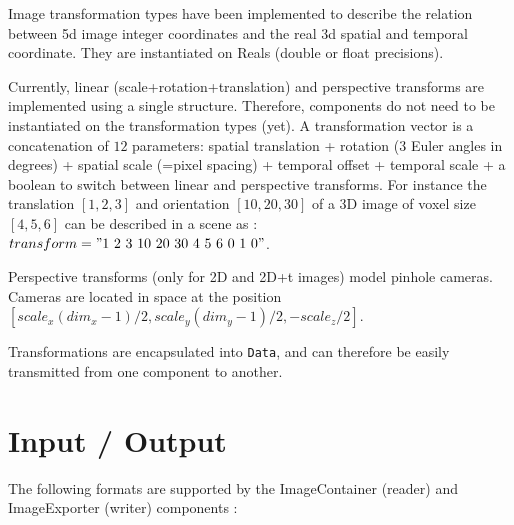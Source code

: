 \noindent Image transformation types have been implemented to describe the relation between 5d image integer coordinates and the real 3d spatial and temporal coordinate. They are instantiated on Reals (double or float precisions).

\noindent Currently, linear (scale+rotation+translation) and perspective transforms are implemented using a single structure. Therefore, components do not need to be instantiated on the transformation types (yet). A transformation vector is a concatenation of $12$ parameters: spatial translation + rotation ($3$ Euler angles in degrees) + spatial scale (=pixel spacing) + temporal offset + temporal scale + a boolean to switch between linear and perspective transforms. For instance the translation  $[1,2,3]$ and orientation $[10,20,30]$ of a 3D image of voxel size $[4,5,6]$ can be described in a scene as : $transform="1 \ 2 \ 3 \ 10 \ 20 \ 30 \ 4 \ 5 \ 6 \ 0 \ 1 \ 0"$.

\noindent Perspective transforms (only for 2D and 2D+t images) model pinhole cameras. Cameras are located in space at the position $[scale_x(dim_x-1)/2, scale_y(dim_y-1)/2, -scale_z/2]$. 

\noindent Transformations are encapsulated into \sofa{} \texttt{Data}, and can therefore be easily transmitted from one component to another. 


\section{Input / Output}

\noindent The following formats are supported by the ImageContainer (reader) and ImageExporter (writer) components :

